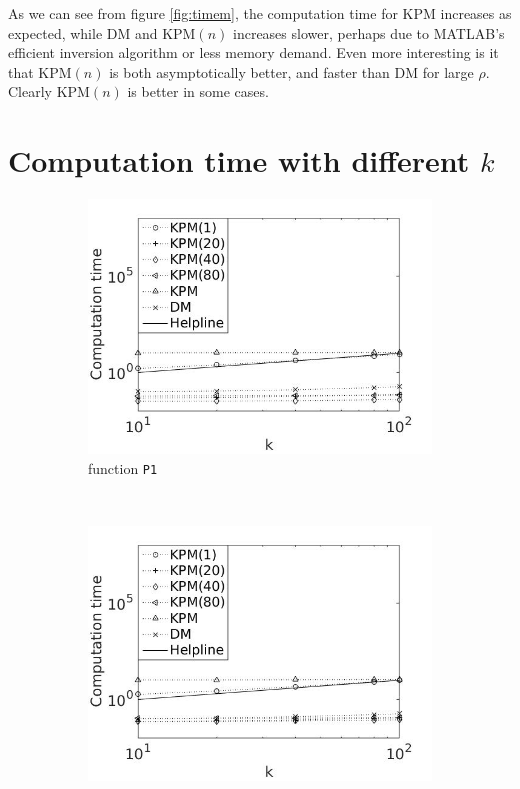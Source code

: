 As we can see from figure \ref{fig:timem}, the computation time for KPM increases as expected, while DM and KPM$(n)$ increases slower, perhaps due to MATLAB's efficient inversion algorithm or less memory demand. 
Even more interesting is it that KPM$(n)$ is both asymptotically better, and faster than DM for large $\rho$. Clearly KPM$(n)$ is better in some cases.
\section{Computation time with different $k$} \label{sec:stimek}
\begin{figure}[H]
        \centering
        \begin{subfigure}[b]{0.45\textwidth}
                \includegraphics[width=\textwidth]{fig/n7timevsk1}
                \caption{function \texttt{P1}}
                \label{fig:timek1}
        \end{subfigure}%
~
        \begin{subfigure}[b]{0.45\textwidth}
                \includegraphics[width=\textwidth]{fig/n8timevsk2}

\end{subfigure}
\end{figure}
